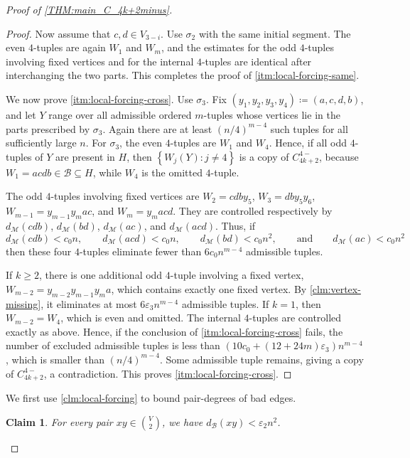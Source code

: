 \documentclass[10pt,a4paper]{article}
\theoremstyle{plain}
\newtheorem{claim}[claim]{Claim}
\theoremstyle{definition}
\begin{document}
\begin{proof}[Proof of \cref{THM:main_C_4k+2minus}]
\begin{proof}
Now assume that $c,d\in V_{3-i}$. Use $\sigma_2$ with the same initial segment. The even $4$-tuples are again $W_1$ and $W_m$, and the estimates for the odd $4$-tuples involving fixed vertices and for the internal $4$-tuples are identical after interchanging the two parts. This completes the proof of \cref{itm:local-forcing-same}.

We now prove \cref{itm:local-forcing-cross}. Use $\sigma_3$. Fix $(y_1, y_2, y_3, y_4) \coloneqq (a, c, d, b)$, and let $Y$ range over all admissible ordered $m$-tuples whose vertices lie in the parts prescribed by $\sigma_3$. Again there are at least $(n/4)^{m-4}$ such tuples for all sufficiently large $n$.
For $\sigma_3$, the even $4$-tuples are $W_1$ and $W_4$. Hence, if all odd $4$-tuples of $Y$ are present in $H$, then $\left\{W_j(Y)\colon j\ne4\right\}$ is a copy of $C_{4k+2}^{4-}$, because $W_1=acdb\in\mathcal B\subseteq H$, while $W_4$ is the omitted $4$-tuple.

The odd $4$-tuples involving fixed vertices are $W_2=cdby_5$, $W_3=dby_5y_6$, $W_{m-1}=y_{m-1}y_mac$, and $W_m=y_macd$.
They are controlled respectively by $d_{\mathcal M}(cdb)$, $d_{\mathcal M}(bd)$, $d_{\mathcal M}(ac)$, and $d_{\mathcal M}(acd)$. Thus, if
\[
d_{\mathcal M}(cdb)<c_0n,
\qquad d_{\mathcal M}(acd)<c_0n,
\qquad d_{\mathcal M}(bd)<c_0n^2,
\qquad\text{and}\qquad d_{\mathcal M}(ac)<c_0n^2
\]
then these four $4$-tuples eliminate fewer than $6c_0n^{m-4}$ admissible tuples.

If $k\ge2$, there is one additional odd $4$-tuple involving a fixed vertex, $W_{m-2}=y_{m-2}y_{m-1}y_ma$, which contains exactly one fixed vertex. By \cref{clm:vertex-missing}, it eliminates at most $6\varepsilon_3 n^{m-4}$ admissible tuples. If $k=1$, then $W_{m-2}=W_4$, which is even and omitted. The internal $4$-tuples are controlled exactly as above. Hence, if the conclusion of \cref{itm:local-forcing-cross} fails, the number of excluded admissible tuples is less than $(10c_0+(12+24m)\varepsilon_3)n^{m-4}$, which is smaller than $(n/4)^{m-4}$. Some admissible tuple remains, giving a copy of $C_{4k+2}^{4-}$, a contradiction. This proves \cref{itm:local-forcing-cross}.
\end{proof}

We first use \cref{clm:local-forcing} to bound pair-degrees of bad edges.

\begin{claim}\label{clm:pair-bad}
For every pair $xy\in\binom V2$, we have $d_{\mathcal B}(xy)<\varepsilon_2n^2$. 
\end{claim}


\end{proof}
\end{document}
